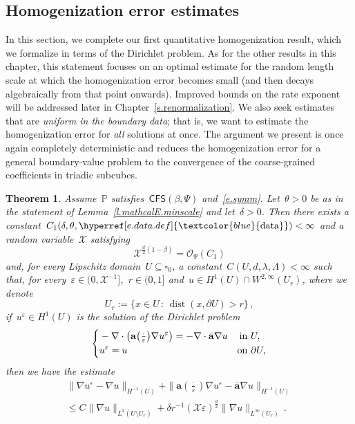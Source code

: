 \documentclass[11pt,twoside]{article} %
\let\oldsquare\square %
\renewcommand{\square}{\oldsquare}
\numberwithin{equation}{section}
\newtheorem{theorem}{Theorem}[section]
\theoremstyle{definition}
\newcommand{\dataref}{\hyperref[e.data.def]{\textcolor{blue}{\ensuremath{\mathrm{data}}}}}
\let\originalleft\left
\let\originalright\right
\renewcommand{\left}{\mathopen{}\mathclose\bgroup\originalleft}
\renewcommand{\right}{\aftergroup\egroup\originalright}
\newcommand{\eps}{\varepsilon}
\newcommand{\ep}{\eps}
\renewcommand{\a}{\mathbf{a}}
\newcommand{\ahom}{\bar{\a}}
\newcommand{\cu}{\square}
\renewcommand{\P}{\mathbb{P}}
\newcommand{\X}{\mathcal{X}}
\renewcommand{\O}{\mathcal{O}}
\DeclareMathOperator{\dist}{dist}
\newcommand{\CFS}{\mathsf{CFS}}
\begin{document}
\subsection{Homogenization error estimates}
\label{ss.det}

In this section, we complete our first quantitative homogenization result, which we formalize in terms of the Dirichlet problem. 
As for the other results in this chapter, this statement focuses on an optimal estimate for the random length scale at which the homogenization error becomes small (and then decays algebraically from that point onwards).
Improved bounds on the rate exponent will be addressed later in Chapter~\ref{s.renormalization}. 
We also seek estimates that are \emph{uniform in the boundary data}; that is, we want to estimate the homogenization error for \emph{all} solutions at once. The argument we present is once again completely deterministic and reduces the homogenization error for a general boundary-value problem to the convergence of the coarse-grained coefficients in triadic subcubes. 



\begin{theorem}
\label{t.quant.DP}
Assume~$\P$ satisfies~$\CFS(\beta,\Psi)$ and~\eqref{e.symm}. 
Let~$\theta >0$ be as in the statement of Lemma~\ref{l.mathcalE.minscale} and let~$\delta>0$. Then there exists a constant~$C_1(\delta,\theta,\dataref)<\infty$ and a random variable~$\X$ satisfying 
\begin{equation}
\label{e.mmmbound1}
\X^{\frac d2 (1-\beta)}
= \O_\Psi(C_1)
\end{equation}
and, for every Lipschitz domain~$U\subseteq \cu_0$, a constant~$C(U,d,\lambda,\Lambda)<\infty$ such that, for every~$\ep \in (0,\X^{-1} ]$,~$r \in (0,1]$ and~$u\in H^1(U) \cap W^{2,\infty}(U_r)$, where we denote
\begin{equation*}
U_r := \{x \in U \, : \, \dist(x,\partial U)> r\}\,,
\end{equation*}
if~$u^\ep\in H^1(U)$ is the solution of the Dirichlet problem
\begin{equation*}
\left\{
\begin{aligned}
& -\nabla \cdot \left( \a\left(\tfrac \cdot\ep\right) \nabla u^\ep \right) = -\nabla \cdot \ahom \nabla u &  \mbox{in} & \ U, \\
& u^\ep = u & \mbox{on} & \ \partial U,
\end{aligned}
\right.
\end{equation*}
then we have the estimate
\begin{multline}
\label{e.quant.DP}
\| \nabla u^\ep - \nabla u \|_{H^{-1}(U)} 
+ 
\| \a(\tfrac \cdot \ep) \nabla u^\ep - \ahom \nabla u \|_{H^{-1}(U)} 
\\ 
\leq
C \| \nabla u \|_{{L}^2(U \setminus U_r)} 
+ 
\delta r^{-1} 
(\X \ep)^{\frac{\theta}2} 
\| \nabla u \|_{L^\infty(U_r)} 
\,.
\end{multline}
\end{theorem}
\end{document}

